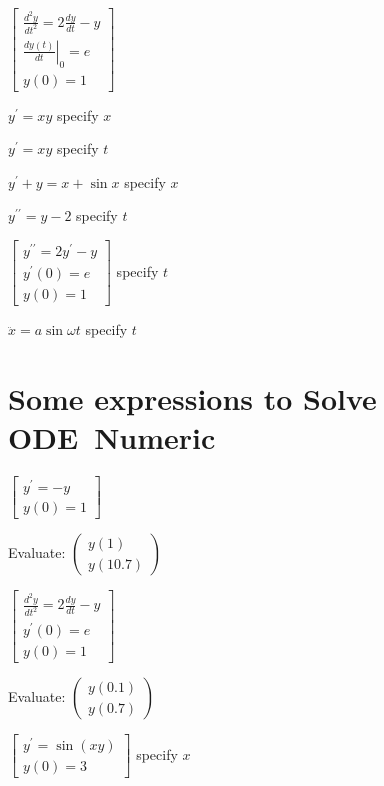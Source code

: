 \documentclass{article}
\begin{document}
$\left[ 
\begin{array}{c}
\frac{d^{2}y}{dt^{2}}=2\frac{dy}{dt}-y \\ 
\left. \frac{dy\left( t\right) }{dt}\right\vert _{0}=e \\ 
y\left( 0\right) =1%
\end{array}%
\right] $

$y^{\prime }=xy$ specify $x$

$y^{\prime }=xy$ specify $t$

$y^{\prime }+y=x+\sin x$ specify $x$

$y^{\prime \prime }=y-2$ specify $t$

$\left[ 
\begin{array}{c}
y^{\prime \prime }=2y^{\prime }-y \\ 
y^{\prime }\left( 0\right) =e \\ 
y\left( 0\right) =1%
\end{array}%
\right] $ specify $t$

$\ddot{x}=a\sin \omega t$ specify $t$

\section{Some expressions to Solve ODE\ Numeric}

$\left[ 
\begin{array}{r}
y^{\prime }=-y \\ 
y(0)=1%
\end{array}%
\right] $

Evaluate: $\left( 
\begin{array}{r}
y\left( 1\right) \\ 
y\left( 10.7\right)%
\end{array}%
\right) $

$\left[ 
\begin{array}{c}
\frac{d^{2}y}{dt^{2}}=2\frac{dy}{dt}-y \\ 
y^{\prime }\left( 0\right) =e \\ 
y\left( 0\right) =1%
\end{array}%
\right] $

Evaluate: $\left( 
\begin{array}{r}
y\left( 0.1\right) \\ 
y\left( 0.7\right)%
\end{array}%
\right) $

$\left[ 
\begin{array}{r}
y^{\prime }=\sin \left( xy\right) \\ 
y(0)=3%
\end{array}%
\right] $ specify $x$
\end{document}
